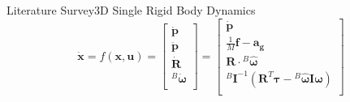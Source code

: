 \documentclass{beamer}
\begin{document}
\begin{frame}{Literature Survey}{3D Single Rigid Body Dynamics}
    \[
        \dot{\mathbf{x}} = f(\mathbf{x}, \mathbf{u})
        = \begin{bmatrix}
            \dot{\mathbf{p}}                \\
            \ddot{\mathbf{p}}               \\
            \dot{\mathbf{R}}                \\
            {}^{B}\dot{\boldsymbol{\omega}} \\
        \end{bmatrix}
        = \begin{bmatrix}
            \dot{\mathbf{p}}                                                                                                     \\
            \frac{1}{M}\mathbf{f} - \mathbf{a_g}                                                                                 \\
            \mathbf{R} \cdot {}^{B}\boldsymbol{\hat{\omega}}                                                                     \\
            {}^{B}\mathbf{I}^{-1}(\mathbf{R}^T\boldsymbol{\tau} -  {}^{B}\boldsymbol{\hat{\omega}}\mathbf{I}\boldsymbol{\omega}) \\
        \end{bmatrix}
    \]
\end{frame}
\end{document}

